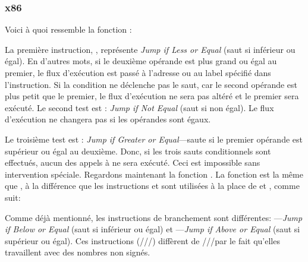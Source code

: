 \subsubsection{x86}


Voici à quoi ressemble la fonction  :




La première instruction, \JLE, représente \emph{Jump if Less or Equal} (saut si inférieur ou égal).
En d'autres mots, si le deuxième opérande est plus grand ou égal au premier,
le flux d'exécution est passé à l'adresse ou au label spécifié dans l'instruction.
Si la condition ne déclenche pas le saut, car le second opérande est plus petit que
le premier, le flux d'exécution ne sera pas altéré et le premier \printf sera
exécuté.
Le second test est \JNE: \emph{Jump if Not Equal} (saut si non égal).
Le flux d'exécution ne changera pas si les opérandes sont égaux.

Le troisième test est \JGE: \emph{Jump if Greater or Equal}---saute si le premier
opérande est supérieur ou égal au deuxième.
Donc, si les trois sauts conditionnels sont effectués, aucun des appels à \printf
ne sera exécuté.
Ceci est impossible sans intervention spéciale.
Regardons maintenant la fonction .
La fonction  est la même que , à la différence
que les instructions \JBE et \JAE sont utilisées à la place de \JLE et \JGE, comme
suit:




Comme déjà mentionné, les instructions de branchement sont différentes:
\JBE---\emph{Jump if Below or Equal} (saut si inférieur ou égal) et \JAE---\emph{Jump if Above or Equal}
(saut si supérieur ou égal).
Ces instructions (\JA/\JAE/\JB/\JBE) diffèrent de \JG/\JGE/\JL/\JLE par le fait qu'elles
travaillent avec des nombres non signés.


